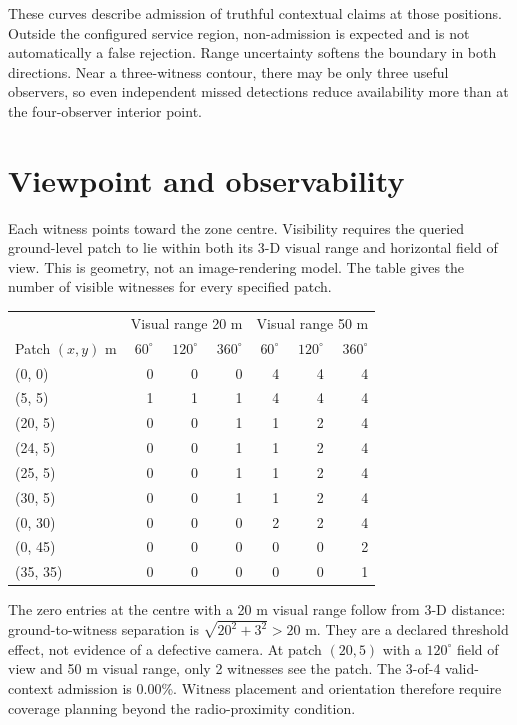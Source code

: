 \documentclass[11pt,a4paper]{article}
\begin{document}
These curves describe admission of truthful contextual claims at those positions. Outside the
configured service region, non-admission is expected and is not automatically a false rejection.
Range uncertainty softens the boundary in both directions. Near a three-witness contour,
there may be only three useful observers, so even independent missed detections reduce
availability more than at the four-observer interior point.

\clearpage\section*{Viewpoint and observability}
Each witness points toward the zone centre. Visibility requires the queried ground-level patch
to lie within both its 3-D visual range and horizontal field of view. This is geometry, not an
image-rendering model. The table gives the number of visible witnesses for every specified patch.
\begin{center}\small\begin{tabular}{lrrrrrr}\toprule
 & \multicolumn{3}{c}{Visual range 20 m} & \multicolumn{3}{c}{Visual range 50 m}\\
Patch $(x,y)$ m & $60^\circ$ & $120^\circ$ & $360^\circ$ & $60^\circ$ & $120^\circ$ & $360^\circ$\\\midrule
(0, 0) & 0 & 0 & 0 & 4 & 4 & 4 \\
(5, 5) & 1 & 1 & 1 & 4 & 4 & 4 \\
(20, 5) & 0 & 0 & 1 & 1 & 2 & 4 \\
(24, 5) & 0 & 0 & 1 & 1 & 2 & 4 \\
(25, 5) & 0 & 0 & 1 & 1 & 2 & 4 \\
(30, 5) & 0 & 0 & 1 & 1 & 2 & 4 \\
(0, 30) & 0 & 0 & 0 & 2 & 2 & 4 \\
(0, 45) & 0 & 0 & 0 & 0 & 0 & 2 \\
(35, 35) & 0 & 0 & 0 & 0 & 0 & 1 \\
\bottomrule\end{tabular}\end{center}
The zero entries at the centre with a 20 m visual range follow from 3-D distance:
ground-to-witness separation is $\sqrt{20^2+3^2}>20$ m. They are a declared threshold effect,
not evidence of a defective camera. At patch $(20,5)$ with a $120^\circ$ field of view and 50 m
visual range, only 2 witnesses see the patch. The 3-of-4 valid-context
admission is 0.00\%. Witness placement and orientation therefore require
coverage planning beyond the radio-proximity condition.
\end{document}
